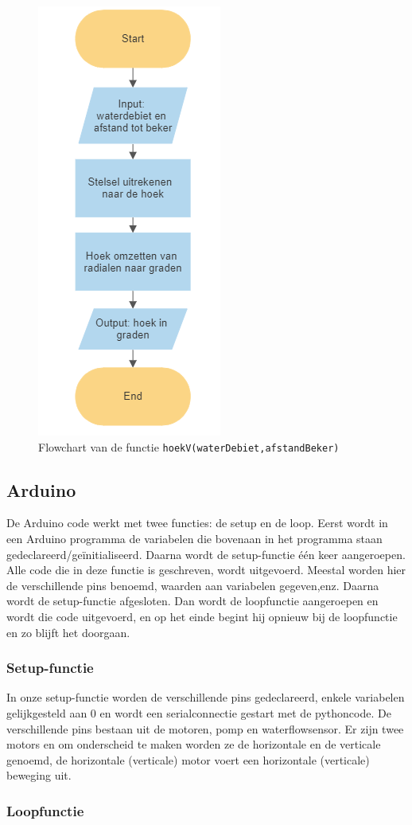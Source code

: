 \documentclass[kulak]{kulakarticle} %
\begin{document}
				\begin{figure} [h!]
					\centering
					\includegraphics[width = .2 \textwidth]{flowchart_hoekV}
				\cprotect\caption{Flowchart van de functie \verb*|hoekV(waterDebiet,afstandBeker)|}
					\label{flowchart_water}
				\end{figure}


	\subsection{Arduino}
	
		De Arduino code werkt met twee functies: de setup en de loop. Eerst wordt in een Arduino programma de variabelen die bovenaan in het programma staan gedeclareerd/geïnitialiseerd. Daarna wordt de setup-functie één keer aangeroepen. Alle code die in deze functie is geschreven, wordt uitgevoerd. Meestal worden hier de verschillende pins benoemd, waarden aan variabelen gegeven,enz. Daarna wordt de setup-functie afgesloten. Dan wordt de loopfunctie aangeroepen en wordt die code uitgevoerd, en op het einde begint hij opnieuw bij de loopfunctie en zo blijft het doorgaan.
		
		
		\subsubsection{Setup-functie}
			In onze setup-functie worden de verschillende pins gedeclareerd, enkele variabelen gelijkgesteld aan 0 en wordt een serialconnectie gestart met de pythoncode. De verschillende pins bestaan uit de motoren, pomp en waterflowsensor. Er zijn twee motors en om onderscheid te maken worden ze de horizontale en de verticale genoemd, de horizontale (verticale) motor voert een horizontale (verticale) beweging uit.
			
			
		\subsubsection{Loopfunctie}
		
\end{document}
